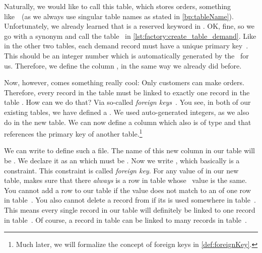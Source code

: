 %
%
%
%
Naturally, we would like to call this table, which stores orders, something like~~(as we always use singular table names as stated in \cref{bp:tableName}).
Unfortunately, we already learned that  is a reserved keyword in \sql.%
%
%
%
OK, fine, so we go with a synonym and call the table~ in \cref{lst:factory:create_table_demand}.
Like in the other two tables, each demand record must have a unique primary key~.
This should be an integer number which is automatically generated by the \db\ for us.
Therefore, we define the column , in the same way we already did before.

Now, however, comes something really cool:
Only customers can make orders.
Therefore, every record in the table  must be linked to exactly one record in the table .
How can we do that?
Via so-called \emph{foreign keys}~\cite{PGDG:PD:FK}.
You see, in both of our existing tables, we have defined a .
We used auto-generated integers, as we also do in the new table.
We can now define a column which also is of type  and that references the primary key of another table.\footnote{%
Much later, we will formalize the concept of foreign keys in \cref{def:foreignKey}.%
}

We can write  to define such a file.
The name of this new column in our table  will be .
We declare it as an  which must be .
Now we write , which basically is a constraint.
This constraint is called \emph{foreign key}.
For any value of  in our new table, makes sure that there \emph{always} is a row in table  whose ~value is the same.
You cannot add a row to our table  if the  value does not match to an  of one row in table~.
You also cannot delete a record from  if its  is used somewhere in table~.
This means every single record in our table  will definitely be linked to one record in table~.
Of course, a record in table  can be linked to many records in table~.

